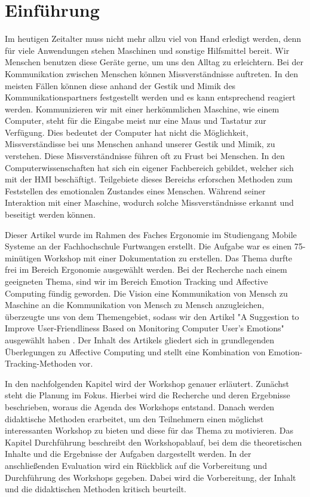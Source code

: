 \section{Einführung}
Im heutigen Zeitalter muss nicht mehr allzu viel von Hand erledigt werden, denn für viele Anwendungen stehen Maschinen und sonstige Hilfsmittel bereit. Wir Menschen benutzen diese Geräte gerne, um uns den Alltag zu erleichtern. Bei der Kommunikation zwischen Menschen können Missverständnisse auftreten. In den meisten Fällen können diese anhand der Gestik und Mimik des Kommunikationspartners festgestellt werden und es kann entsprechend reagiert werden. Kommunizieren wir mit einer herkömmlichen Maschine, wie einem Computer, steht für die Eingabe meist nur eine Maus und Tastatur zur Verfügung. Dies bedeutet der Computer hat nicht die Möglichkeit, Missverständisse bei uns Menschen anhand unserer Gestik und Mimik, zu verstehen. Diese Missverständnisse führen oft zu Frust bei Menschen. In den Computerwissenschaften hat sich ein eigener Fachbereich gebildet, welcher sich mit der \ac{HMI} beschäftigt. Teilgebiete dieses Bereichs erforschen Methoden zum Feststellen des emotionalen Zustandes eines Menschen. Während seiner Interaktion mit einer Maschine, wodurch solche Missverständnisse erkannt und beseitigt werden können.

Dieser Artikel wurde im Rahmen des Faches Ergonomie im Studiengang Mobile Systeme an der Fachhochschule Furtwangen erstellt. Die Aufgabe war es einen 75-minütigen Workshop mit einer Dokumentation zu erstellen. Das Thema durfte frei im Bereich Ergonomie ausgewählt werden. Bei der Recherche nach einem geeigneten Thema, sind wir im Bereich Emotion Tracking und Affective Computing fündig geworden. Die Vision eine Kommunikation von Mensch zu Maschine an die Kommunikation von Mensch zu Mensch anzugleichen, überzeugte uns von dem Themengebiet, sodass wir den Artikel "A Suggestion to Improve User-Friendliness Based on Monitoring Computer User’s Emotions" ausgewählt haben \cite{EmotionTrackingGSR}. Der Inhalt des Artikels gliedert sich in grundlegenden Überlegungen zu Affective Computing und stellt eine Kombination von Emotion-Tracking-Methoden vor.

In den nachfolgenden Kapitel wird der Workshop genauer erläutert. Zunächst steht die Planung im Fokus. Hierbei wird die Recherche und deren Ergebnisse beschrieben, woraus die Agenda des Workshops entstand. Danach werden didaktische Methoden erarbeitet, um den Teilnehmern einen möglichst interessanten Workshop zu bieten und diese für das Thema zu motivieren. Das Kapitel Durchführung beschreibt den Workshopablauf, bei dem die theoretischen Inhalte und die Ergebnisse der Aufgaben dargestellt werden. In der anschließenden Evaluation wird ein Rückblick auf die Vorbereitung und Durchführung des Workshops gegeben. Dabei wird die Vorbereitung, der Inhalt und die didaktischen Methoden kritisch beurteilt.
